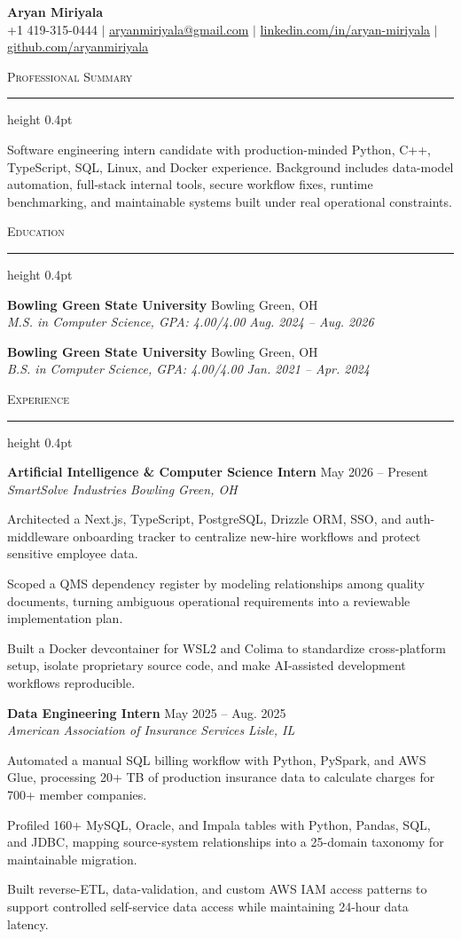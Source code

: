 \documentclass[letterpaper,11pt]{article}
\newcommand{\resumesection}[1]{%
  \par\vspace{2pt}%
  {\large\scshape #1}\par\vspace{2pt}%
  \hrule height 0.4pt\vspace{2pt}%
}
\newcommand{\resumeSubheading}[4]{
  \textbf{#1} \hfill #2\\
  \textit{#3} \hfill \textit{#4}
}
\begin{document}
\begin{center}
  {\LARGE \textbf{Aryan Miriyala}}\\[-1pt]
  \small
  +1 419-315-0444 $|$
  \href{mailto:aryanmiriyala@gmail.com}{aryanmiriyala@gmail.com} $|$
  \href{https://www.linkedin.com/in/aryan-miriyala-7788a21b6/}{linkedin.com/in/aryan-miriyala} $|$
  \href{https://github.com/aryanmiriyala}{github.com/aryanmiriyala}
\end{center}\vspace{-10pt}

\resumesection{Professional Summary}
Software engineering intern candidate with production-minded Python, C++, TypeScript, SQL, Linux, and Docker experience. Background includes data-model automation, full-stack internal tools, secure workflow fixes, runtime benchmarking, and maintainable systems built under real operational constraints.

\resumesection{Education}
\resumeSubheading
{Bowling Green State University}{Bowling Green, OH}
{M.S. in Computer Science, GPA: 4.00/4.00}{Aug. 2024 -- Aug. 2026}

\resumeSubheading
{Bowling Green State University}{Bowling Green, OH}
{B.S. in Computer Science, GPA: 4.00/4.00}{Jan. 2021 -- Apr. 2024}

\resumesection{Experience}
\resumeSubheading
{Artificial Intelligence \& Computer Science Intern}{May 2026 -- Present}
{SmartSolve Industries}{Bowling Green, OH}
\begin{tightitemize}
  \item Architected a Next.js, TypeScript, PostgreSQL, Drizzle ORM, SSO, and auth-middleware onboarding tracker to centralize new-hire workflows and protect sensitive employee data.
  \item Scoped a QMS dependency register by modeling relationships among quality documents, turning ambiguous operational requirements into a reviewable implementation plan.
  \item Built a Docker devcontainer for WSL2 and Colima to standardize cross-platform setup, isolate proprietary source code, and make AI-assisted development workflows reproducible.
\end{tightitemize}

\resumeSubheading
{Data Engineering Intern}{May 2025 -- Aug. 2025}
{American Association of Insurance Services}{Lisle, IL}
\begin{tightitemize}
  \item Automated a manual SQL billing workflow with Python, PySpark, and AWS Glue, processing 20+ TB of production insurance data to calculate charges for 700+ member companies.
  \item Profiled 160+ MySQL, Oracle, and Impala tables with Python, Pandas, SQL, and JDBC, mapping source-system relationships into a 25-domain taxonomy for maintainable migration.
  \item Built reverse-ETL, data-validation, and custom AWS IAM access patterns to support controlled self-service data access while maintaining 24-hour data latency.
\end{tightitemize}
\end{document}
